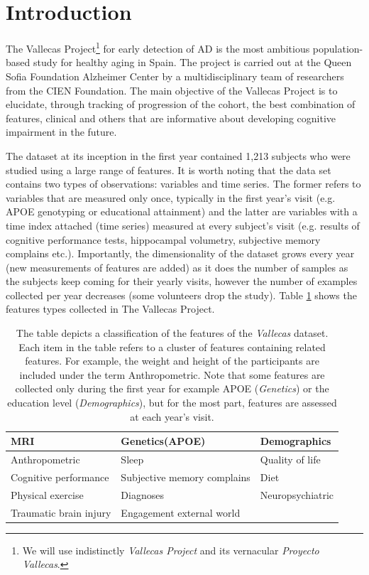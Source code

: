 \documentclass[11pt]{article}
\theoremstyle{definition}
\theoremstyle{remark}
\begin{document}
\section{Introduction}
\label{se:int}
The Vallecas Project\footnote{We will use indistinctly \emph{Vallecas Project} and its vernacular \emph{Proyecto Vallecas}.} for early detection of AD is the most ambitious population-based study for healthy aging in Spain. The project is carried out at the Queen Sofia Foundation Alzheimer Center by a multidisciplinary team of researchers from the CIEN Foundation. The main objective of the Vallecas Project is to elucidate, through tracking of progression of the cohort, the best combination of features, clinical and others that are informative about developing cognitive impairment in the future. 

The dataset at its inception in the first year contained 1,213 subjects who were studied using a large range of features. It is worth noting that the data set contains two types of observations: variables and time series. The former refers to variables that are measured only once, typically in the first year's visit (e.g. APOE genotyping or educational attainment) and the latter are variables with a time index attached (time series) measured at every subject's visit (e.g. results of cognitive performance tests, hippocampal volumetry, subjective memory complains etc.).
Importantly, the dimensionality of the dataset grows every year (new measurements of features are added) as it does the number of samples as the subjects keep coming for their yearly visits, however the number of examples collected per year decreases (some volunteers drop the study). 
Table \ref{tab:vallecasvars} shows the features types collected in The Vallecas Project.

\begin{table}
\begin{tabular}{ |p{4.4cm}|p{4.4cm}|p{4.4cm}| }
\hline
\hline
MRI & Genetics(APOE) & Demographics  \\
\hline
Anthropometric & Sleep & Quality of life \\
\hline
Cognitive performance & Subjective memory complains & Diet \\
\hline
Physical exercise & Diagnoses & Neuropsychiatric \\
\hline
Traumatic brain injury & Engagement external world &  \\
\hline

\hline
\end{tabular}
\caption{The table depicts a classification of the features of the \emph{Vallecas} dataset. Each item in the table refers to a cluster of features containing related features. For example, the weight and height of the participants are included under the term Anthropometric.
Note that some features are collected only during the first year for example APOE (\emph{Genetics}) or the education level (\emph{Demographics}), but for the most part, features are assessed at each year's visit.}
\label{tab:vallecasvars}
\end{table}
\end{document}
